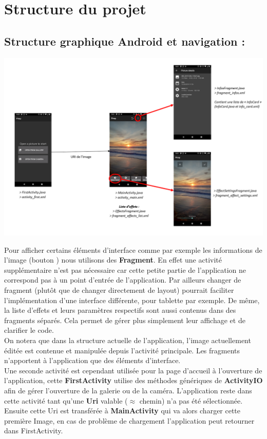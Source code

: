 \section{Structure du projet}

\subsection{Structure graphique Android et navigation :}\label{navig}
\includegraphics[width=1\textwidth]{report_src/app_flowchart_fragments.PNG}

Pour afficher certains éléments d'interface comme par exemple les informations de l'image (bouton \faInfoCircle) nous utilisons des \textbf{Fragment}. En effet une activité supplémentaire n'est pas nécessaire car cette petite partie de l'application ne correspond pas à un point d'entrée de l'application. Par ailleurs changer de fragment (plutôt que de changer directement de layout) pourrait faciliter l'implémentation d'une interface différente, pour tablette par exemple.
De même, la liste d'effets et leurs paramètres respectifs sont aussi contenus dans des fragments séparés. Cela permet de gérer plus simplement leur affichage et de clarifier le code.
\\

On notera que dans la structure actuelle de l'application, l'image actuellement éditée est contenue et manipulée depuis l'activité principale. Les fragments n'apportent à l'application que des éléments d'interface.
\\

Une seconde activité est cependant utilisée pour la page d'accueil à l'ouverture de l'application, cette \textbf{FirstActivity} utilise des méthodes génériques de \textbf{ActivityIO} afin de gérer l'ouverture de la galerie ou de la caméra. L'application reste dans cette activité tant qu'une \textbf{Uri} valable ($\approx$ chemin) n'a pas été sélectionnée. Ensuite cette Uri est transférée à \textbf{MainActivity} qui va alors charger cette première Image, en cas de problème de chargement l'application peut retourner dans FirstActivity.


